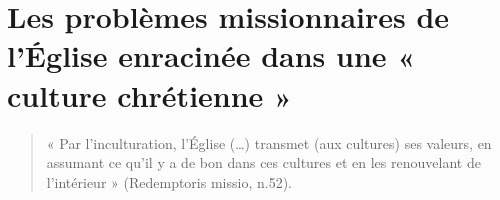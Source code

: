\section{Les problèmes missionnaires de l’Église enracinée dans une « culture chrétienne » }
\begin{quote}
      « Par l’inculturation, l’Église (…) transmet (aux cultures) ses valeurs, en assumant ce qu’il y a de bon dans ces cultures et en les renouvelant de l’intérieur » (Redemptoris missio, n.52).  
\end{quote}
 


 

 